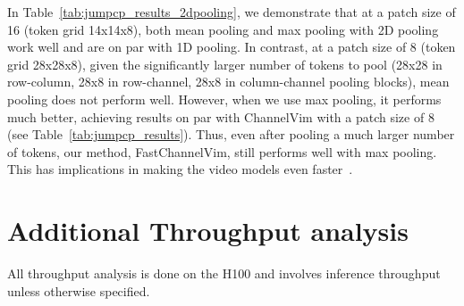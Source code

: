 \begin{enumerate}
In Table~\ref{tab:jumpcp_results_2dpooling}, we demonstrate that at a patch size of 16 (token grid 14x14x8), both mean pooling and max pooling with 2D pooling work well and are on par with 1D pooling. In contrast, at a patch size of 8 (token grid 28x28x8), given the significantly larger number of tokens to pool (28x28 in row-column, 28x8 in row-channel, 28x8 in column-channel pooling blocks), mean pooling does not perform well. However, when we use max pooling, it performs much better, achieving results on par with ChannelVim with a patch size of 8 (see Table~\ref{tab:jumpcp_results}). Thus, even after pooling a much larger number of tokens, our method, FastChannelVim, still performs well with max pooling. This has implications in making the video models even faster~\cite{kahatapitiya2025object}.



\end{enumerate}





\section{Additional Throughput analysis}
\label{additional_throughput}

All throughput analysis is done on the H100 and involves inference throughput unless otherwise specified. 
\\

